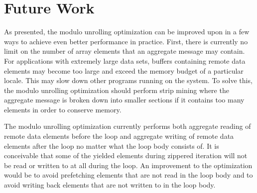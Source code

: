 \section{Future Work}\label{sec:future_work}

As presented, the modulo unrolling optimization can be improved upon in a few ways to achieve even better performance in practice. First, there is currently no limit on the number of array elements that an aggregate message may contain. For applications with extremely large data sets, buffers containing remote data elements may become too large and exceed the memory budget of a particular locale. This may slow down other programs running on the system. To solve this, the modulo unrolling optimization should perform strip mining where the aggregate message is broken down into smaller sections if it contains too many elements in order to conserve memory. 

The modulo unrolling optimization currently performs both aggregate reading of remote data elements before the loop and aggregate writing of remote data elements after the loop no matter what the loop body consists of. It is conceivable that some of the yielded elements during zippered iteration will not be read or written to at all during the loop. An improvement to the optimization would be to avoid prefetching elements that are not read in the loop body and to avoid writing back elements that are not written to in the loop body. 
